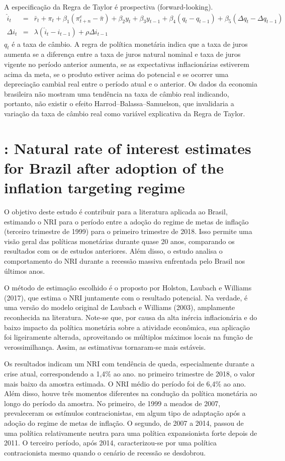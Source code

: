 A especificação da Regra de Taylor é prospectiva (forward-looking).
\begin{eqnarray}
    \hat{i}_t &=& \bar{r}_t + \pi_t + \beta_1 (\pi_{t+n}^{e} - \bar{\pi} ) + \beta_2 y_t + \beta_3 y_{t-1} + \beta_4 (q_t - q_{t-1}) + \beta_5 (\Delta q_t -  \Delta q_{t-1}) \\
    \Delta i_t &=& \lambda(\hat{i}_t - i_{t-1}) + \rho \Delta i_{t-1}
\end{eqnarray}
$q_t$ é a taxa de câmbio. A regra de política monetária indica que a taxa de juros aumenta se a diferença entre a taxa de juros natural nominal e taxa de juros vigente no período anterior aumenta, se as expectativas inflacionárias estiverem acima da meta, se o produto estiver acima do potencial e se ocorrer uma depreciação cambial real entre o período atual e o anterior. Os dados da economia brasileira não mostram uma tendência na taxa de câmbio real indicando, portanto, não existir o efeito Harrod–Balassa–Samuelson, que invalidaria a variação da taxa de câmbio real como variável explicativa da Regra de Taylor.
%
%
\section{\citet{Moreira:2019}: Natural rate of interest estimates for Brazil after adoption of the inflation targeting regime }

O objetivo deste estudo é contribuir para a literatura aplicada ao Brasil, estimando o NRI para o período entre a adoção do regime de metas de inflação (terceiro trimestre de 1999) para o primeiro trimestre de 2018. Isso permite uma visão geral das políticas monetárias durante quase 20 anos, comparando os resultados com os de estudos anteriores. Além disso, o estudo analisa o comportamento do NRI durante a recessão massiva enfrentada pelo Brasil nos últimos anos.

O método de estimação escolhido é o proposto por Holston, Laubach e Williams (2017), que estima o NRI juntamente com o resultado potencial. Na verdade, é uma versão do modelo original de Laubach e Williams (2003), amplamente reconhecida na literatura. Note-se que, por causa da alta inércia inflacionária e do baixo impacto da política monetária sobre a atividade econômica, sua aplicação foi ligeiramente alterada, aproveitando os múltiplos máximos locais na função de verossimilhança. Assim, as estimativas tornaram-se mais estáveis.

Os resultados indicam um NRI com tendência de queda, especialmente durante a crise atual, correspondendo a 1,4$\%$ ao ano. no primeiro trimestre de 2018, o valor mais baixo da amostra estimada. O NRI médio do período foi de 6,4$\%$ ao ano. Além disso, houve três momentos diferentes na condução da política monetária ao longo do período da amostra. No primeiro, de 1999 a meados de 2007, prevaleceram os estímulos contracionistas, em algum tipo de adaptação após a adoção do regime de metas de inflação. O segundo, de 2007 a 2014, passou de uma política relativamente neutra para uma política expansionista forte depois de 2011. O terceiro período, após 2014, caracterizou-se por uma política contracionista mesmo quando o cenário de recessão se desdobrou.

